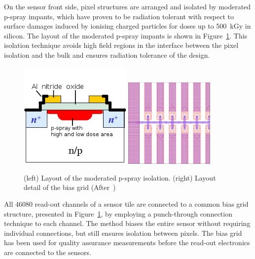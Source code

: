 On the sensor front side, pixel structures are arranged and isolated by moderated p-spray impants, 
which have proven to be radiation tolerant with respect to surface damages induced by ionising charged 
particles for doses up to 500~kGy in silicon. The layout of the moderated p-spray impants is 
shown in Figure~\ref{fig:modpspray}. This isolation technique avoids high field regions in the interface between the pixel isolation and the bulk and ensures radiation tolerance of the design.
\begin{figure}[!htbp]
\centering
\includegraphics[width=0.49\textwidth]{modpspray.png}
\includegraphics[width=0.39\textwidth]{biasgrid.png}
\caption{\label{fig:modpspray}(left) Layout of the moderated p-spray isolation. (right)  Layout detail of the bias grid (After~\cite{AtlasPixels})}
\end{figure}
All 46080 read-out channels of a sensor tile are connected to a common bias grid structure, presented 
in Figure~\ref{fig:modpspray}, by employing a punch-through connection technique to each channel.
 The method biases the entire sensor without requiring individual connections, but still ensures isolation between pixels. The bias grid has been used for quality assurance measurements before the read-out electronics are connected to the sensors. 

